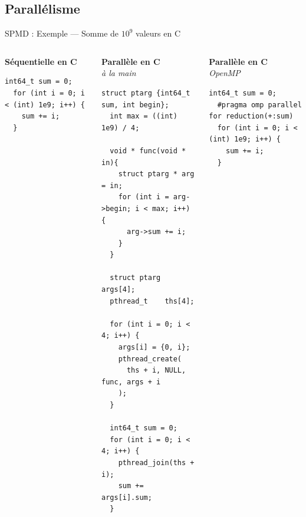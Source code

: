 \documentclass[../main.tex]{subfiles}
\begin{document}
\subsection*{Parallélisme}
\begin{frame}[fragile]{SPMD : Exemple --- Somme de $10^9$ valeurs en C}
  \begin{columns}
    \begin{column}{.33\linewidth}
      \begin{overlayarea}{\linewidth}{.87\textheight}
        \centering
        \textbf{Séquentielle en C}\\\textit{\phantom{OpenMP}} \vspace{.00\textheight}

        \begin{lstlisting}[style=cstyle,basicstyle=\tiny]
  int64_t sum = 0;
  for (int i = 0; i < (int) 1e9; i++) {
    sum += i;
  }\end{lstlisting}
      \end{overlayarea}
    \end{column}
    \begin{column}{.33\linewidth}
      \begin{overlayarea}{\linewidth}{.87\textheight}
        \centering
        \textbf{Parallèle en C}\\\textit{\phantom{p}à la main\phantom{O}} \vspace{.00\textheight}

        \begin{lstlisting}[style=cstyle,basicstyle=\tiny]
  struct ptarg {int64_t sum, int begin};
  int max = ((int) 1e9) / 4;
  
  void * func(void * in){
    struct ptarg * arg = in; 
    for (int i = arg->begin; i < max; i++) {
      arg->sum += i;
    }
  }
  
  struct ptarg args[4];
  pthread_t    ths[4];
  
  for (int i = 0; i < 4; i++) {
    args[i] = {0, i};
    pthread_create(
      ths + i, NULL, func, args + i
    );
  }
  
  int64_t sum = 0;
  for (int i = 0; i < 4; i++) {
    pthread_join(ths + i);
    sum += args[i].sum;
  }\end{lstlisting}
      \end{overlayarea}
    \end{column}
    \begin{column}{.33\linewidth}
      \begin{overlayarea}{\linewidth}{.87\textheight}
        \centering
        \textbf{Parallèle en C}\\\textit{OpenMP} \vspace{.00\textheight}

        \begin{lstlisting}[style=cstyle,basicstyle=\tiny]
  int64_t sum = 0;
  #pragma omp parallel for reduction(+:sum)
  for (int i = 0; i < (int) 1e9; i++) {
    sum += i;
  }\end{lstlisting}
      \end{overlayarea}
    \end{column}
  \end{columns}
\end{frame}
\end{document}
